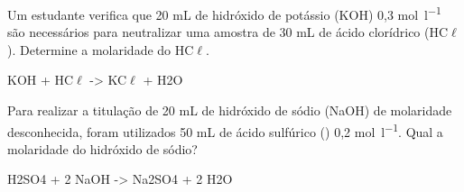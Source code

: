 \documentclass[12pt]{scrartcl}
\begin{document}
\begin{exercise}
Um estudante verifica que 20 mL de hidróxido de potássio (KOH) 0,3 \unit{\mol\per\litre} são necessários para neutralizar uma amostra de 30 mL de ácido clorídrico (HC\(\ell\)). Determine a molaridade do HC\(\ell\).
\begin{reaction*}
KOH + HC$\ell$ -> KC$\ell$ + H2O 
\end{reaction*}
\end{exercise}



\begin{exercise}
Para realizar a titulação de 20 mL de hidróxido de sódio (NaOH) de molaridade desconhecida, foram utilizados 50 mL de ácido sulfúrico () 0,2 \unit{\mol\per\litre}. Qual a molaridade do hidróxido de sódio?

\begin{reaction*}
H2SO4 + 2 NaOH -> Na2SO4 + 2 H2O
\end{reaction*}
\end{exercise}




\end{document}

